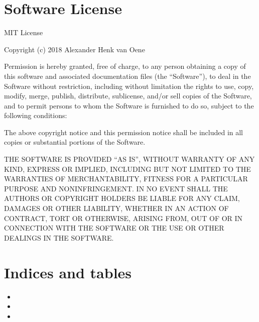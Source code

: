 \documentclass[letterpaper,10pt,english]{sphinxmanual}
\begin{document}
\chapter{Software License}
\label{\detokenize{license:software-license}}\label{\detokenize{license:license}}\label{\detokenize{license::doc}}
\sphinxAtStartPar
MIT License

\sphinxAtStartPar
Copyright (c) 2018 Alexander Henk van Oene

\sphinxAtStartPar
Permission is hereby granted, free of charge, to any person obtaining a
copy of this software and associated documentation files (the
“Software”), to deal in the Software without restriction, including
without limitation the rights to use, copy, modify, merge, publish,
distribute, sublicense, and/or sell copies of the Software, and to
permit persons to whom the Software is furnished to do so, subject to
the following conditions:

\sphinxAtStartPar
The above copyright notice and this permission notice shall be included
in all copies or substantial portions of the Software.

\sphinxAtStartPar
THE SOFTWARE IS PROVIDED “AS IS”, WITHOUT WARRANTY OF ANY KIND, EXPRESS
OR IMPLIED, INCLUDING BUT NOT LIMITED TO THE WARRANTIES OF
MERCHANTABILITY, FITNESS FOR A PARTICULAR PURPOSE AND NONINFRINGEMENT.
IN NO EVENT SHALL THE AUTHORS OR COPYRIGHT HOLDERS BE LIABLE FOR ANY
CLAIM, DAMAGES OR OTHER LIABILITY, WHETHER IN AN ACTION OF CONTRACT,
TORT OR OTHERWISE, ARISING FROM, OUT OF OR IN CONNECTION WITH THE
SOFTWARE OR THE USE OR OTHER DEALINGS IN THE SOFTWARE.


\chapter{Indices and tables}
\label{\detokenize{index:indices-and-tables}}\begin{itemize}
\item {} 
\sphinxAtStartPar
{}

\item {} 
\sphinxAtStartPar
{}

\item {} 
\sphinxAtStartPar
{}

\end{itemize}


\renewcommand{\indexname}{Python Module Index}
\begin{sphinxtheindex}
\let\bigletter\sphinxstyleindexlettergroup
\bigletter{r}
\item\relax{}
\item\relax{}
\item\relax{}
\end{sphinxtheindex}

\renewcommand{\indexname}{Index}
\printindex
\end{document}
